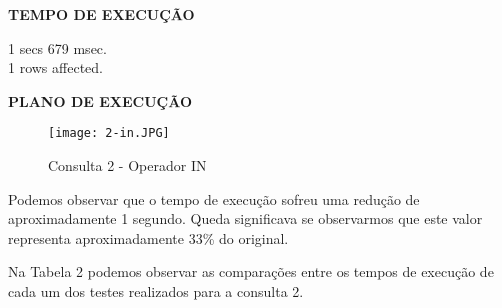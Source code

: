 \documentclass[12pt,a4paper]{article}
\begin{document}
\begin{flushleft}
\textbf{TEMPO DE EXECUÇÃO}\\
\end{flushleft}
1 secs 679 msec.\\
1 rows affected.\\

\begin{flushleft}
\textbf{PLANO DE EXECUÇÃO}\\
\end{flushleft}

\begin{figure}[H]
    \centering
    \texttt{[image: 2-in.JPG]}
    \caption{Consulta 2 - Operador IN}
    \label{fig:diagrama}
\end{figure}

Podemos observar que o tempo de execução sofreu uma redução de aproximadamente 1 segundo. Queda significava se observarmos que este valor representa aproximadamente 33\% do original.

\pagebreak
Na Tabela 2 podemos observar as comparações entre os tempos de execução de cada um dos testes realizados para a consulta 2.

\begin{table}[htbp]
  \centering
  \caption{Comparação Consulta 2}
  \label{tab:compconsulta2}%
\end{table}%
\end{document}
